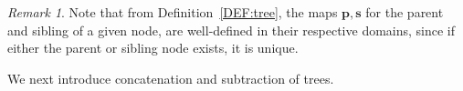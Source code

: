 \documentclass[%
11pt,  reqno]{amsart}
\makeatletter
\newcommand{\5}{\textup{V}}
\newcommand{\noi}{\noindent}
\newtheorem{example}{Example}
\theoremstyle{remark}
\newtheorem{remark}[theorem]{Remark}
\newcommand{\pb}{\mathbf{p}}
\newcommand{\sbf}{\mathbf{s}}
\def\<#1>{\csname MH@symb@#1\endcsname}
\numberwithin{equation}{section}
\numberwithin{theorem}{section}
\newcommand{\andreia}[1]{\marginpar{\color{purple} $\Leftarrow\Leftarrow\Leftarrow$}{\smallskip \noi\color{purple}ANDREIA: #1}\smallskip}
\makeatother
\begin{document}
\begin{remark}\rm 
Note that from Definition~\ref{DEF:tree}, the maps $\pb, \sbf$ for the parent and sibling of a given node, are well-defined in their respective domains, since if either the parent or sibling node exists, it is unique. 

\end{remark}


%



%
%
%








We next introduce concatenation and subtraction of trees. %
\end{document}
